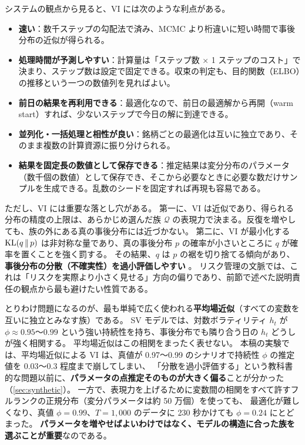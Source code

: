 システムの観点から見ると、VI には次のような利点がある。

\begin{itemize}
  \item \textbf{速い}：数千ステップの勾配法で済み、MCMC より桁違いに短い時間で事後分布の近似が得られる。
  \item \textbf{処理時間が予測しやすい}：計算量は「ステップ数 × 1 ステップのコスト」で決まり、ステップ数は設定で固定できる。収束の判定も、目的関数（ELBO）の推移という一つの数値列を見ればよい。
  \item \textbf{前日の結果を再利用できる}：最適化なので、前日の最適解から再開（warm start）すれば、少ないステップで今日の解に到達できる。
  \item \textbf{並列化・一括処理と相性が良い}：銘柄ごとの最適化は互いに独立であり、そのまま複数の計算資源に振り分けられる。
  \item \textbf{結果を固定長の数値として保存できる}：推定結果は変分分布のパラメータ（数千個の数値）として保存でき、そこから必要なときに必要な数だけサンプルを生成できる。乱数のシードを固定すれば再現も容易である。
\end{itemize}

ただし、VI には重要な落とし穴がある。
第一に、VI は近似であり、得られる分布の精度の上限は、あらかじめ選んだ族 $\mathcal{Q}$ の表現力で決まる。反復を増やしても、族の外にある真の事後分布には近づかない。
第二に、VI が最小化する $\mathrm{KL}(q \,\|\, p)$ は非対称な量であり、真の事後分布 $p$ の確率が小さいところに $q$ が確率を置くことを強く罰する。
その結果、$q$ は $p$ の裾を切り捨てる傾向があり、\textbf{事後分布の分散（不確実性）を過小評価しやすい} \parencite{blei2017}。
リスク管理の文脈では、これは「リスクを実際より小さく見せる」方向の偏りであり、前節で述べた説明責任の観点から最も避けたい性質である。

とりわけ問題になるのが、最も単純で広く使われる\textbf{平均場近似}（すべての変数を互いに独立とみなす族）である。
SV モデルでは、対数ボラティリティ $h_t$ が $\phi \approx 0.95$〜$0.99$ という強い持続性を持ち、事後分布でも隣り合う日の $h_t$ どうしが強く相関する。
平均場近似はこの相関をまったく表せない。
本稿の実験では、平均場近似による VI は、真値が 0.97〜0.99 のシナリオで持続性 $\phi$ の推定値を 0.03〜0.3 程度まで崩してしまい、
「分散を過小評価する」という教科書的な問題以前に、\textbf{パラメータの点推定そのものが大きく偏る}ことが分かった（\cref{sec:synthetic}）。
一方で、表現力を上げるために変数間の相関をすべて許すフルランクの正規分布（変分パラメータは約 50 万個）を使っても、
最適化が難しくなり、真値 $\phi = 0.99$、$T = 1{,}000$ のデータに 230 秒かけても $\phi = 0.24$ にとどまった。
\textbf{パラメータを増やせばよいわけではなく、モデルの構造に合った族を選ぶことが重要}なのである。


